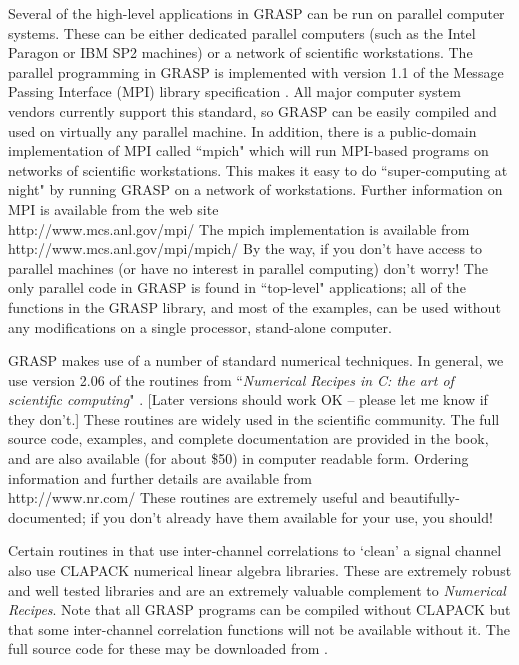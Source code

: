 Several of the high-level applications in GRASP can be run on parallel
computer systems.  These can be either dedicated parallel computers
(such as the Intel Paragon or IBM SP2 machines) or a network of
scientific workstations.  The parallel programming in GRASP is
implemented with version 1.1 of the Message Passing Interface (MPI)
library specification \cite{MPI}.  All major computer system vendors
currently support this standard, so GRASP can be easily compiled and
used on virtually any parallel machine.  In addition, there is a
public-domain implementation of MPI called ``mpich" \cite{MPICH} which
will run MPI-based programs on networks of scientific workstations.
This makes it easy to do ``super-computing at night" by running GRASP on
a network of workstations.  Further information on MPI is available
from the web site\\
{http://www.mcs.anl.gov/mpi/}
The mpich
implementation is available from\\
{http://www.mcs.anl.gov/mpi/mpich/}
By the way, if you don't have access to parallel machines (or have no
interest in parallel computing) don't worry!  The only parallel code in
GRASP is found in ``top-level" applications; all of the functions in
the GRASP library, and most of the examples, can be used without any
modifications on a single processor, stand-alone computer.

GRASP makes use of a number of standard numerical techniques.  In general,
we use version 2.06 of the routines from ``{\it Numerical Recipes in
C: the art of scientific computing}" \cite{NumRec}.  [Later versions
should work OK -- please let me know if they don't.]  These routines
are widely used in the scientific community.  The full source code,
examples, and complete documentation are provided in the book,
and are also available (for about \$50) in computer readable form.
Ordering information and further details are available from\\
{http://www.nr.com/}
These routines are
extremely useful and beautifully-documented; if you don't already have
them available for your use, you should!

Certain routines in that use inter-channel correlations to `clean' a
signal channel also use CLAPACK numerical linear algebra libraries. 
These are extremely robust and well tested libraries and are an
extremely valuable complement to {\it Numerical Recipes}.  
Note that all GRASP programs can be compiled without CLAPACK but that
some inter-channel correlation functions will not be available without
it. The full source code 
for these may be downloaded from
.

